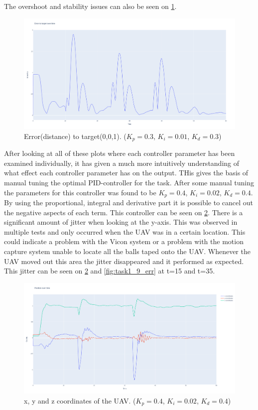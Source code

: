 \documentclass[conference]{IEEEtran}
\begin{document}
The overshoot and stability issues can also be seen on \cref{fig:task1_4_err}. 
\begin{figure}[hbtp]
	\centering
	\includegraphics[width=1.0\linewidth]{images/task1_4_err.png}
	\caption{Error(distance) to target(0,0,1). ($K_p = 0.3$, $K_i = 0.01$, $K_d = 0.3$)}
	\label{fig:task1_4_err}
\end{figure}

After looking at all of these plots where each controller parameter has been examined individually, it has given a much more intuitively understanding of what effect each controller parameter has on the output. THis gives the basis of manual tuning the optimal PID-controller for the task. After some manual tuning the parameters for this controller was found to be $K_p = 0.4$, $K_i = 0.02$, $K_d = 0.4$. By using the proportional, integral and derivative part it is possible to cancel out the negative aspects of each term. This controller can be seen on \cref{fig:task1_9_pos}. There is a significant amount of jitter when looking at the y-axis. This was observed in multiple tests and only occurred when the UAV was in a certain location. This could indicate a problem with the Vicon system or a problem with the motion capture system unable to locate all the balls taped onto the UAV. Whenever the UAV moved out this area the jitter disappeared and it performed as expected. This jitter can be seen on \cref{fig:task1_9_pos} and \cref{fig:task1_9_err} at t=15 and t=35.

\begin{figure}[hbtp]
	\centering
	\includegraphics[width=1.0\linewidth]{images/task1_9_pos.png}
	\caption{x, y and z coordinates of the UAV. ($K_p = 0.4$, $K_i = 0.02$, $K_d = 0.4$)}
	\label{fig:task1_9_pos}
\end{figure}
\end{document}
